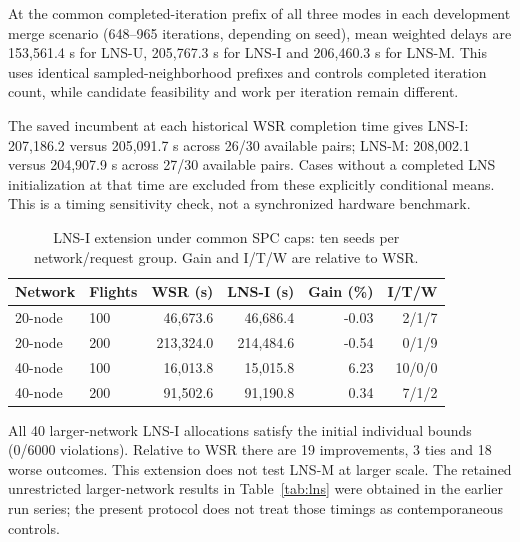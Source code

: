 At the common completed-iteration prefix of all three modes in each development merge scenario (648--965 iterations, depending on seed), mean weighted delays are 153,561.4 s for LNS-U, 205,767.3 s for LNS-I and 206,460.3 s for LNS-M. This uses identical sampled-neighborhood prefixes and controls completed iteration count, while candidate feasibility and work per iteration remain different.

The saved incumbent at each historical WSR completion time gives LNS-I: 207,186.2 versus 205,091.7 s across 26/30 available pairs; LNS-M: 208,002.1 versus 204,907.9 s across 27/30 available pairs. Cases without a completed LNS initialization at that time are excluded from these explicitly conditional means. This is a timing sensitivity check, not a synchronized hardware benchmark.

\begin{table}[!htbp]
\centering\small
\caption{LNS-I extension under common SPC caps: ten seeds per network/request group. Gain and I/T/W are relative to WSR.}\label{tab:protected-large}
\begin{tabular}{llrrrr}
\toprule
Network & Flights & WSR (s) & LNS-I (s) & Gain (\%) & I/T/W\\
\midrule
20-node & 100 & 46,673.6 & 46,686.4 & -0.03 & 2/1/7\\
20-node & 200 & 213,324.0 & 214,484.6 & -0.54 & 0/1/9\\
40-node & 100 & 16,013.8 & 15,015.8 & 6.23 & 10/0/0\\
40-node & 200 & 91,502.6 & 91,190.8 & 0.34 & 7/1/2\\
\bottomrule
\end{tabular}
\end{table}

All 40 larger-network LNS-I allocations satisfy the initial individual bounds (0/6000 violations). Relative to WSR there are 19 improvements, 3 ties and 18 worse outcomes. This extension does not test LNS-M at larger scale. The retained unrestricted larger-network results in Table~\ref{tab:lns} were obtained in the earlier run series; the present protocol does not treat those timings as contemporaneous controls.
